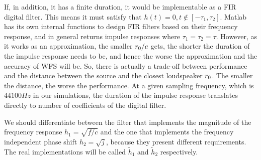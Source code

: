 If, in addition, it has a finite duration, it would be implementable as a FIR digital filter. This means it must satisfy that $h(t) = 0, t \notin [-\tau_1, \tau_2]$. Matlab has its own internal functions to design FIR filters based on their frequency response, and in general returns impulse responses where $\tau_1 = \tau_2 = \tau$. However, as it works as an approximation, the smaller $r_0/c$ gets, the shorter the duration of the impulse response needs to be, and hence the worse the approximation and the accuracy of WFS will be. So, there is actually a trade-off between performance and the distance between the source and the closest loudspeaker $r_0$. The smaller the distance, the worse the performance. At a given sampling frequency, which is $44100 \si{Hz}$ in our simulations, the duration of the impulse response translates directly to number of coefficients of the digital filter.

We should differentiate between the filter that implements the magnitude of the frequency response $h_1 = \sqrt{f/c}$ and the one that implements the frequency independent phase shift $h_2 = \sqrt{j}$, because they present different requirements. The real implementations will be called $\widetilde{h}_1$ and $\widetilde{h}_2$ respectively.

